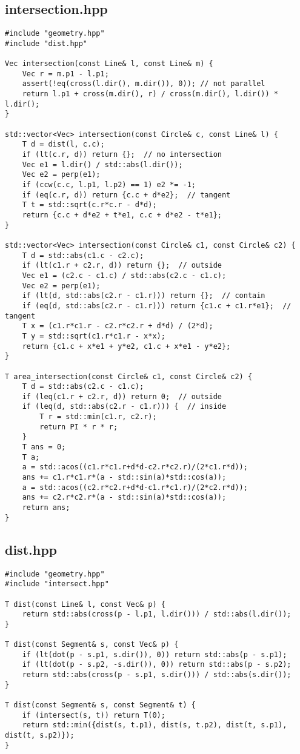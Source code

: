 \subsection{intersection.hpp}

\begin{lstlisting}
#include "geometry.hpp"
#include "dist.hpp"

Vec intersection(const Line& l, const Line& m) {
    Vec r = m.p1 - l.p1;
    assert(!eq(cross(l.dir(), m.dir()), 0)); // not parallel
    return l.p1 + cross(m.dir(), r) / cross(m.dir(), l.dir()) * l.dir();
}

std::vector<Vec> intersection(const Circle& c, const Line& l) {
    T d = dist(l, c.c);
    if (lt(c.r, d)) return {};  // no intersection
    Vec e1 = l.dir() / std::abs(l.dir());
    Vec e2 = perp(e1);
    if (ccw(c.c, l.p1, l.p2) == 1) e2 *= -1;
    if (eq(c.r, d)) return {c.c + d*e2};  // tangent
    T t = std::sqrt(c.r*c.r - d*d);
    return {c.c + d*e2 + t*e1, c.c + d*e2 - t*e1};
}

std::vector<Vec> intersection(const Circle& c1, const Circle& c2) {
    T d = std::abs(c1.c - c2.c);
    if (lt(c1.r + c2.r, d)) return {};  // outside
    Vec e1 = (c2.c - c1.c) / std::abs(c2.c - c1.c);
    Vec e2 = perp(e1);
    if (lt(d, std::abs(c2.r - c1.r))) return {};  // contain
    if (eq(d, std::abs(c2.r - c1.r))) return {c1.c + c1.r*e1};  // tangent
    T x = (c1.r*c1.r - c2.r*c2.r + d*d) / (2*d);
    T y = std::sqrt(c1.r*c1.r - x*x);
    return {c1.c + x*e1 + y*e2, c1.c + x*e1 - y*e2};
}

T area_intersection(const Circle& c1, const Circle& c2) {
    T d = std::abs(c2.c - c1.c);
    if (leq(c1.r + c2.r, d)) return 0;  // outside
    if (leq(d, std::abs(c2.r - c1.r))) {  // inside
        T r = std::min(c1.r, c2.r);
        return PI * r * r;
    }
    T ans = 0;
    T a;
    a = std::acos((c1.r*c1.r+d*d-c2.r*c2.r)/(2*c1.r*d));
    ans += c1.r*c1.r*(a - std::sin(a)*std::cos(a));
    a = std::acos((c2.r*c2.r+d*d-c1.r*c1.r)/(2*c2.r*d));
    ans += c2.r*c2.r*(a - std::sin(a)*std::cos(a));
    return ans;
}

\end{lstlisting}

\subsection{dist.hpp}

\begin{lstlisting}
#include "geometry.hpp"
#include "intersect.hpp"

T dist(const Line& l, const Vec& p) {
    return std::abs(cross(p - l.p1, l.dir())) / std::abs(l.dir());
}

T dist(const Segment& s, const Vec& p) {
    if (lt(dot(p - s.p1, s.dir()), 0)) return std::abs(p - s.p1);
    if (lt(dot(p - s.p2, -s.dir()), 0)) return std::abs(p - s.p2);
    return std::abs(cross(p - s.p1, s.dir())) / std::abs(s.dir());
}

T dist(const Segment& s, const Segment& t) {
    if (intersect(s, t)) return T(0);
    return std::min({dist(s, t.p1), dist(s, t.p2), dist(t, s.p1), dist(t, s.p2)});
}

\end{lstlisting}

